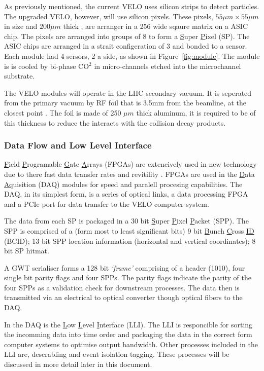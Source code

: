       As previously mentioned, the current VELO uses silicon strips to detect particles.
      The upgraded VELO, however, will use silicon pixels.
      These pixels, $55 \mu m \times 55 \mu m$ in size and $200 \mu m$ thick \cite{velo_design_report}, are arranger in a 256 wide sqaure matrix on a ASIC chip.
      The pixels are arranged into groups of 8 to form a \underline{S}uper \underline{P}ixel (SP).
      The ASIC chips are arranged in a strait configeration of 3 and bonded to a sensor.
      Each module had 4 sersors, 2 a side, as shown in Figure~\ref{fig:module}. 
      The module is is cooled by bi-phase CO$^2$ in micro-channels etched into the microchannel substrate.
      \par
      The VELO modules will operate in the LHC secondary vacuum.
      It is seperated from the primary vacuum by RF foil that is 3.5mm from the beamline, at the closest point \cite{velo_design_report}.
      The foil is made of 250 $\mu m$ thick aluminum, it is required to be of this thickness to reduce the interacts with the collision decay products. 

      \subsubsection{Data Flow and Low Level Interface}   

      \underline{F}ield \underline{P}rogramable \underline{G}ate \underline{A}rrays (FPGAs) are extencively used in new technology due to there fast data transfer rates and revitility \cite{fpga}. 
      FPGAs are used in the \underline{D}ata \underline{Aq}uisition (DAQ) modules for speed and paralell procesing capabilities.
      The DAQ, in its simplest form, is a series of optical links, a data processing FPGA and a PCIe port for data transfer to the VELO computer system.
      \par
      The data from each SP is packaged in a 30 bit \underline{S}uper \underline{P}ixel \underline{P}acket (SPP). The SPP is comprised of  a (form most to least significant bits) 9 bit \underline{B}unch \underline{C}ross \underline{ID} (BCID); 13 bit SPP location information (horizontal and vertical coordinates); 8 bit SP hitmat.
      \par
      A GWT serialiser forms a 128 bit \textit{`frame'} comprising of a header (1010), four single bit parity flags and four SPPs.
      The parity flags indicate the parity of the four SPPs as a validation check for downstream processes.
      The data then is transmitted via an electrical to optical converter though optical fibers to the DAQ.
      \par
      In the DAQ is the \underline{L}ow \underline{L}evel \underline{I}nterface (LLI).
      The LLI is responcible for sorting the incomming data into time order and packaging the data in the correct form computer systems to optimise output bandwidth.
      Other processes included in the LLI are, descrabling and event isolation tagging.
      These processes will be discussed in more detail later in this document.



